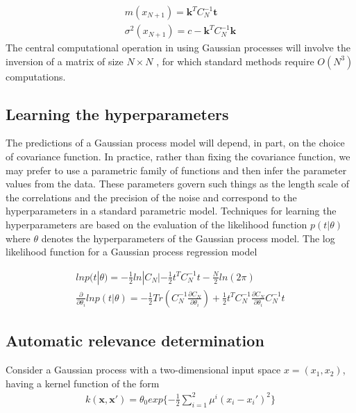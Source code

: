 \documentclass[a4paper]{article}
\begin{document}
\begin{align}
m(x_{N+1}) = \mathbf{k}^TC_N^{-1}\mathbf{t}\\
\sigma^2(x_{N+1}) = c-\mathbf{k}^TC_N^{-1}\mathbf{k}
\end{align}
The central computational operation in using Gaussian processes will
involve the inversion of a matrix of size $N \times N$ , for which
standard methods require $O(N^3)$ computations.

\subsection{Learning the hyperparameters}
The predictions of a Gaussian process model will depend, in part, on
the choice of covariance function. In practice, rather than ﬁxing the covariance function, we
may prefer to use a parametric family of functions and then infer the
parameter values from the data. These parameters govern such things as
the length scale of the correlations and the precision of the noise
and correspond to the hyperparameters in a standard parametric model.
Techniques for learning the hyperparameters are based on the
evaluation of the likelihood function $p(t|\theta)$ where $\theta$
denotes the hyperparameters of the Gaussian process model.
The log likelihood function for a Gaussian process regression model

\begin{align}
ln p(t|\theta) = - \frac{1}{2} ln |C_N| - \frac{1}{2} t^TC_N^{-1}t - \frac{N}{2} ln(2\pi)\\
\frac{\partial}{\partial \theta_i} ln p(t|\theta) = - \frac{1}{2}
  Tr(C_N^{-1}\frac{\partial C_N}{\partial \theta_i}) + \frac{1}{2}
  t^TC_N^{-1} \frac{\partial C_N}{\partial \theta_i} C_N^{-1}t
\end{align}

\subsection{Automatic relevance determination}
Consider a Gaussian process with a two-dimensional input space $x =
(x_1, x_2)$, having a kernel function of the form
\begin{align}
k(\mathbf{x}, \mathbf{x}') = \theta_0 exp \{-\frac{1}{2}
  \sum_{i=1}^{2} \mu^i(x_i - x_i')^2 \}
\end{align}
\end{document}
